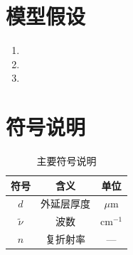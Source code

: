 
\section{模型假设}
\begin{enumerate}[leftmargin=2em]
    \item 
    \item 
    \item 
\end{enumerate}

\section{符号说明}

\begin{table}[htbp]
\centering
\caption{主要符号说明}
\begin{tabular}{c|c|c}
\toprule
符号 & 含义 & 单位 \\
\midrule
$d$ & 外延层厚度 & $\mu$m \\
$\tilde{\nu}$ & 波数 & cm$^{-1}$ \\
$n$ & 复折射率 & --- \\
\bottomrule
\end{tabular}
\end{table}